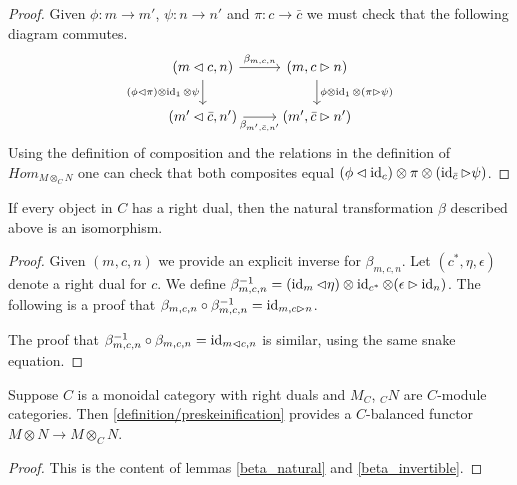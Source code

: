 \begin{proof}
  Given $\phi:m\to m'$, $\psi: n\to n'$ and $\pi:c\to \bar{c}$ we must check
  that the following diagram commutes.
  \[
    \begin{tikzcd}
      {(m\lhd c, n)} & {(m,c\rhd n)} \\
      {(m'\lhd \bar{c}, n')} & {(m',\bar{c}\rhd n')}
      \arrow["{\beta_{m,c,n}}", from=1-1, to=1-2]
      \arrow["{(\phi\lhd\pi)\otimes\id_1\otimes\psi}"', from=1-1, to=2-1]
      \arrow["{\phi\otimes\id_1\otimes(\pi\rhd\psi)}", from=1-2, to=2-2]
      \arrow["{\beta_{m',\bar{c},n'}}"', from=2-1, to=2-2]
    \end{tikzcd}
  \]
  Using the definition of composition and the relations in the definition of
  $Hom_{M\otimes_C N}$ one can check that both composites equal
  $(\phi\lhd\operatorname{id}_c)\otimes\pi\otimes(\operatorname{id}_{\bar{c}}\rhd\psi)$.
\end{proof}

\begin{lemma}\label{beta_invertible}
  If every object in $C$ has a right dual, then the natural transformation
  $\beta$ described above is an isomorphism.
\end{lemma}

\begin{proof}
  Given $(m,c,n)$ we provide an explicit inverse for $\beta_{m,c,n}$. Let
  $(c^*,\eta,\epsilon)$ denote a right dual for $c$. We define
  $\beta^{-1}_{m,c,n}=(\operatorname{id}_m\lhd\eta)\otimes\operatorname{id}_{c^*}\otimes
  (\epsilon\rhd\operatorname{id}_n)$. The following is a proof that
  $\beta_{m,c,n}\circ\beta_{m,c,n}^{-1}=\operatorname{id}_{m,c\rhd n}$.
  \begin{center}\end{center}

  \noindent The proof that $\beta_{m,c,n}^{-1}\circ\beta_{m,c,n}=\operatorname{id}_{m\lhd c,n}$ is
  similar, using the same snake equation.
\end{proof}

\begin{proposition}\label{is_balanced}

\noindent Suppose $C$ is a monoidal category with right duals and $M_C$, $_{C}N$ are
$C$-module categories. Then
\ref{definition/preskeinification} provides a $C$-balanced
functor $M\otimes N\to M\otimes_C N$.
\end{proposition}

\begin{proof}
  This is the content of lemmas \ref{beta_natural} and \ref{beta_invertible}.
\end{proof}

